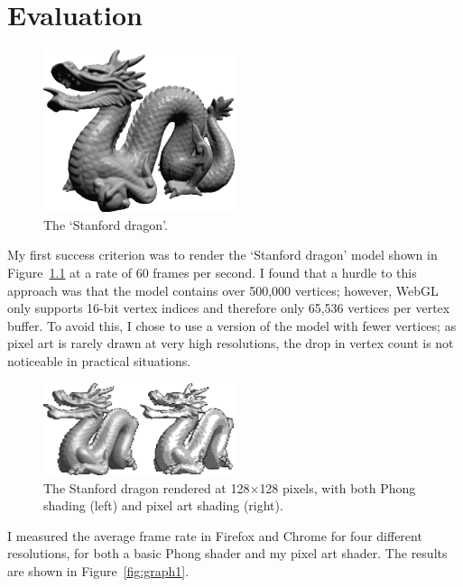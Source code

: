 \documentclass[12pt,twoside,notitlepage]{report}
\begin{document}
\chapter{Evaluation}

\begin{figure}[h!]
\centering
\includegraphics[width=0.5\textwidth]{stanforddragon}
\caption{The `Stanford dragon'.}
\label{fig:dragon}
\end{figure}

My first success criterion was to render the `Stanford dragon' model shown in Figure~\ref{fig:dragon} at a rate of 60 frames per second. I found that a hurdle to this approach was that the model contains over 500,000 vertices; however, WebGL only supports 16-bit vertex indices and therefore only 65,536 vertices per vertex buffer. To avoid this, I chose to use a version of the model with fewer vertices; as pixel art is rarely drawn at very high resolutions, the drop in vertex count is not noticeable in practical situations.

\begin{figure}[h!]
\centering
\includegraphics[width=0.5\textwidth]{shadeddragon}
\caption{The Stanford dragon rendered at 128$\times$128 pixels, with both Phong shading (left) and pixel art shading (right).}
\label{fig:shadeddragon}
\end{figure}

I measured the average frame rate in Firefox and Chrome for four different resolutions, for both a basic Phong shader and my pixel art shader. The results are shown in Figure~\ref{fig:graph1}.
\end{document}
